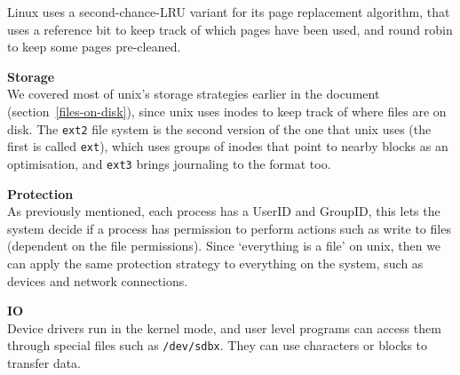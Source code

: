 \begin{description}
  Linux uses a second-chance-LRU variant for its page replacement algorithm,
  that uses a reference bit to keep track of which pages have been used, and
  round robin to keep some pages pre-cleaned.

  \item \textbf{Storage}\\
  We covered most of unix's storage strategies earlier in the document
  (section~\ref{files-on-disk}), since unix uses inodes to keep track of where
  files are on disk. The \texttt{ext2} file system is the second version of the
  one that unix uses (the first is called \texttt{ext}), which uses groups of
  inodes that point to nearby blocks as an optimisation, and \texttt{ext3}
  brings journaling to the format too.

  \item \textbf{Protection}\\
  As previously mentioned, each process has a UserID and GroupID, this lets the
  system decide if a process has permission to perform actions such as write to
  files (dependent on the file permissions). Since `everything is a file' on
  unix, then we can apply the same protection strategy to everything on the
  system, such as devices and network connections.

  \item \textbf{IO}\\
  Device drivers run in the kernel mode, and user level programs can access them
  through special files such as \texttt{/dev/sdbx}. They can use characters or
  blocks to transfer data.

\end{description}
